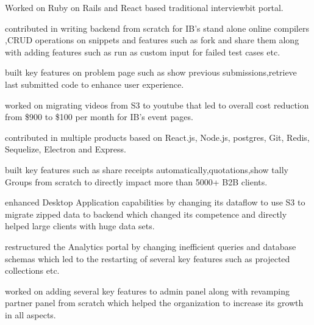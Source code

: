 \documentclass[]{deedy-resume-openfont}
\begin{document}
\begin{minipage}[t][0pt]{0.65\textwidth}
\href{https://www.interviewbit.com}{}

\begin{tightemize}
\item Worked on Ruby on Rails and React based traditional interviewbit portal.
\item contributed in writing backend from scratch for IB's stand alone online compilers ,CRUD operations on snippets and features such as fork and share them along with adding features such as run as custom input for failed test cases etc.
\item built key features on problem page such as show previous submissions,retrieve last submitted code to enhance user experience.
\item worked on migrating videos from S3 to youtube that led to overall cost reduction from \$900 to \$100 per month for IB's event pages.
\end{tightemize}
\sectionsep


\href{https://credflow.in}{}
\begin{tightemize}
\item contributed in multiple products based on React.js, Node.js, postgres, Git, Redis, Sequelize, Electron and Express.
\item built key features such as share receipts automatically,quotations,show tally Groups from scratch to directly impact more than 5000+ B2B clients.
\item enhanced Desktop Application capabilities by changing its dataflow to use S3 to migrate zipped data to backend which changed its competence and directly helped large clients with huge data sets.
\item restructured the Analytics portal by changing inefficient queries and database schemas which led to the restarting of several key features such as projected collections etc.
\item worked on adding several key features to admin panel along with revamping partner panel from scratch which helped the organization to increase its growth in all aspects.
\end{tightemize}
\sectionsep


\end{minipage}
\end{document}

